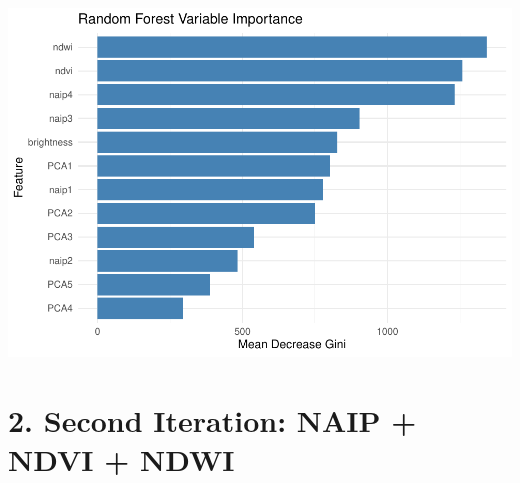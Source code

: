 \documentclass[
]{article}
\begin{document}
\includegraphics{veg_model_new_class_files/figure-latex/unnamed-chunk-5-3.pdf}

\section{2. Second Iteration: NAIP + NDVI +
NDWI}\label{second-iteration-naip-ndvi-ndwi}
\end{document}
